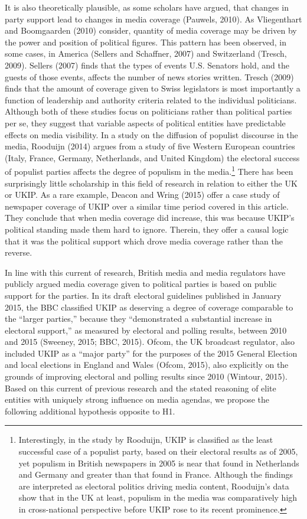 \documentclass[12pt,article]{article}
\let\rmarkdownfootnote\footnote%
\def\footnote{\protect\rmarkdownfootnote}
\begin{document}
It is also theoretically plausible, as some scholars have argued, that
changes in party support lead to changes in media coverage (Pauwels,
2010). As Vliegenthart and Boomgaarden (2010) consider, quantity of
media coverage may be driven by the power and position of political
figures. This pattern has been observed, in some cases, in America
(Sellers and Schaffner, 2007) and Switzerland (Tresch, 2009). Sellers
(2007) finds that the types of events U.S. Senators hold, and the guests
of those events, affects the number of news stories written. Tresch
(2009) finds that the amount of coverage given to Swiss legislators is
most importantly a function of leadership and authority criteria related
to the individual politicians. Although both of these studies focus on
politicians rather than political parties per se, they suggest that
variable aspects of political entities have predictable effects on media
visibility. In a study on the diffusion of populist discourse in the
media, Rooduijn (2014) argues from a study of five Western European
countries (Italy, France, Germany, Netherlands, and United Kingdom) the
electoral success of populist parties affects the degree of populism in
the
media.\footnote{Interestingly, in the study by Rooduijn, UKIP is classified as the least successful case of a populist party, based on their electoral results as of 2005, yet populism in British newspapers in 2005 is near that found in Netherlands and Germany and greater than that found in France. Although the findings are interpreted as electoral politics driving media content, Rooduijn's data show that in the UK at least, populism in the media was comparatively high in cross-national perspective before UKIP rose to its recent prominence.}
There has been surprisingly little scholarship in this field of research
in relation to either the UK or UKIP. As a rare example, Deacon and
Wring (2015) offer a case study of newspaper coverage of UKIP over a
similar time period covered in this article. They conclude that when
media coverage did increase, this was because UKIP's political standing
made them hard to ignore. Therein, they offer a causal logic that it was
the political support which drove media coverage rather than the
reverse.

In line with this current of research, British media and media
regulators have publicly argued media coverage given to political
parties is based on public support for the parties. In its draft
electoral guidelines published in January 2015, the BBC classified UKIP
as deserving a degree of coverage comparable to the ``larger parties,''
because they ``demonstrated a substantial increase in electoral
support,'' as measured by electoral and polling results, between 2010
and 2015 (Sweeney, 2015; BBC, 2015). Ofcom, the UK broadcast regulator,
also included UKIP as a ``major party'' for the purposes of the 2015
General Election and local elections in England and Wales (Ofcom, 2015),
also explicitly on the grounds of improving electoral and polling
results since 2010 (Wintour, 2015). Based on this current of previous
research and the stated reasoning of elite entities with uniquely strong
influence on media agendas, we propose the following additional
hypothesis opposite to H1.
\end{document}
